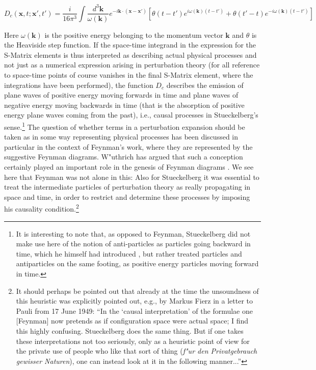 \documentclass[12pt]{article}
\begin{document}
\begin{equation}
\label{eq:causal}
D_c (\mathbf{x}, t; \mathbf{x}', t') = \frac{i}{16 \pi^3} \int \frac{d^3 \mathbf{k}}{\omega (\mathbf{k})} e^{-i \mathbf{k} \cdot (\mathbf{x} - \mathbf{x}')} \left[ \theta (t-t') e^{i \omega(\mathbf{k}) (t-t')} + \theta (t'-t) e^{-i \omega(\mathbf{k}) (t-t')} \right]
\end{equation}

Here $\omega (\mathbf{k})$ is the positive energy belonging to the momentum vector $\mathbf{k}$ and $\theta$ is the Heaviside step function. If the space-time integrand in the expression for the S-Matrix elements is thus interpreted as describing actual physical processes and not just as a numerical expression arising in perturbation theory (for all reference to space-time points of course vanishes in the final S-Matrix element, where the integrations have been performed), the function $D_c$ describes the emission of plane waves of positive energy moving forwards in time and plane waves of negative energy moving backwards in time (that is the absorption of positive energy plane waves coming from the past), i.e., causal processes in Stueckelberg's sense.\footnote{It is interesting to note that, as opposed to Feynman, Stueckelberg did not make use here of the notion of anti-particles as particles going backward in time, which he himself had introduced \citep{stueckelberg_1941_la-signification}, but rather treated particles and antiparticles on the same footing, as positive energy particles moving forward in time.} The question of whether terms in a perturbation expansion should be taken as in some way representing physical processes has been discussed in particular in the context of Feynman's work, where they are represented by the suggestive Feynman diagrams. W"uthrich has argued that such a conception certainly played an important role in the genesis of Feynman diagrams \citep{wuethrich_2010_the-genesis}. We see here that Feynman was not alone in this: Also for Stueckelberg it was essential to treat the intermediate particles of perturbation theory as really propagating in space and time, in order to restrict and determine these processes by imposing his causality condition.\footnote{\label{fn:fierz} It should perhaps be pointed out that already at the time the unsoundness of this heuristic was explicitly pointed out, e.g., by Markus Fierz in a letter to Pauli from 17 June 1949: ``In the `causal interpretation' of the formulae one [Feynman] now pretends as if configuration space were actual space; I find this highly confusing. Stueckelberg does the same thing. But if one takes these interpretations not too seriously, only as a heuristic point of view for the private use of people who like that sort of thing (\emph{f"ur den Privatgebrauch gewisser Naturen}), one can instead look at it in the following manner...''}
\end{document}
